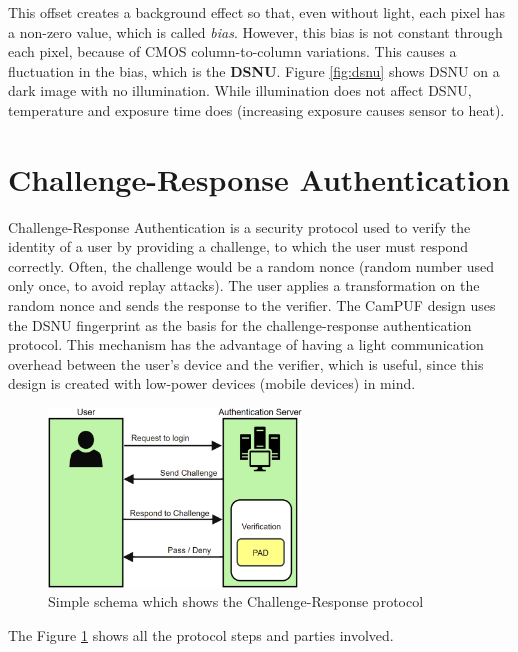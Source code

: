 This offset creates a background effect so that, even without light, each pixel has a non-zero value, which is called \textit{bias}.
However, this bias is not constant through each pixel, because of CMOS column-to-column variations. This causes a fluctuation in the bias, which is the \textbf{DSNU}.
Figure \ref{fig:dsnu} shows DSNU on a dark image with no illumination. While illumination does not affect DSNU, temperature and exposure time does (increasing exposure causes sensor to heat).

\section{\textbf{Challenge-Response Authentication}}

Challenge-Response Authentication is a security protocol used to verify the identity of a user by providing a challenge, to which the user must respond correctly.
Often, the challenge would be a random nonce (random number used only once, to avoid replay attacks). The user applies a transformation on the random nonce and sends the response to the verifier.
The CamPUF design uses the DSNU fingerprint as the basis for the challenge-response authentication protocol.
This mechanism has the advantage of having a light communication overhead between the user's device and the verifier, which is useful, since this design is created with low-power devices (mobile devices) in mind.

\begin{figure}[h!]                      %
    \centering
    \includegraphics[width=0.6\textwidth]{images/Challenge_Response_Auth.png}
    \caption{Simple schema which shows the Challenge-Response protocol}
    \label{fig:cr_auth}
\end{figure}

The Figure \ref{fig:cr_auth} shows all the protocol steps and parties involved.



